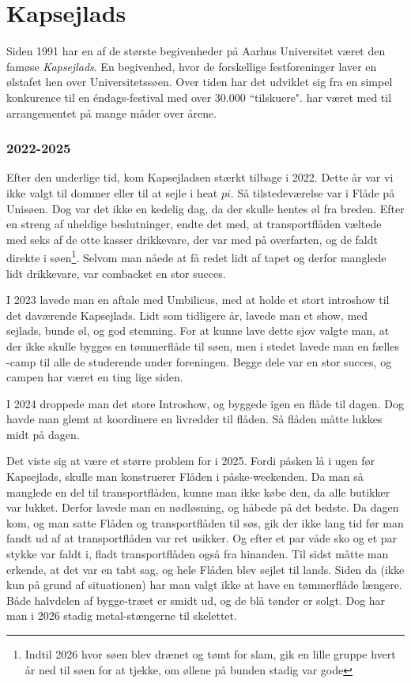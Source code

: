 \chapter{Kapsejlads}
Siden 1991 har en af de største begivenheder på Aarhus Universitet været den famøse \textit{Kapsejlads}. En begivenhed, hvor de forskellige festforeninger laver en ølstafet hen over Universitetssøen. Over tiden har det udviklet sig fra en simpel konkurence til en éndags-festival med over 30.000 ``tilskuere". \TKET har været med til arrangementet på mange måder over årene. 

\subsection{2022-2025}
Efter den underlige tid, kom Kapsejladsen stærkt tilbage i 2022. Dette år var vi ikke valgt til dommer eller til at sejle i heat $pi$. Så \TKETs tilstedeværelse var i \TKETs Flåde på Unisøen. Dog var det ikke en kedelig dag, da der skulle hentes øl fra breden. Efter en streng af uheldige beslutninger, endte det med, at transportflåden væltede med seks af de otte kasser drikkevare, der var med på overfarten, og de faldt direkte i søen\footnote{Indtil 2026 hvor søen blev drænet og tømt for slam, gik en lille gruppe hvert år ned til søen for at tjekke, om øllene på bunden stadig var gode}. Selvom man nåede at få redet lidt af tapet og derfor manglede lidt drikkevare, var combacket en stor succes.

I 2023 lavede man en aftale med Umbilicus, med at holde et stort introshow til det daværende Kapsejlads. Lidt som tidligere år, lavede man et show, med sejlads, bunde øl, og god stemning. For at kunne lave dette sjov valgte man, at der ikke skulle bygges en tømmerflåde til søen, men i stedet lavede man en fælles \TKET-camp til alle de studerende under foreningen. Begge dele var en stor succes, og campen har været en ting lige siden.

I 2024 droppede man det store Introshow, og byggede igen en flåde til dagen. Dog havde man glemt at koordinere en livredder til flåden. Så flåden måtte lukkes midt på dagen. 

Det viste sig at være et større problem for i 2025. Fordi påsken lå i ugen før Kapsejlads, skulle man konstruerer Flåden i påske-weekenden. Da man så manglede en del til transportflåden, kunne man ikke købe den, da alle butikker var lukket. Derfor lavede man en nødløsning, og håbede på det bedste. Da dagen kom, og man satte Flåden og transportflåden til søs, gik der ikke lang tid før man fandt ud af at transportflåden var ret usikker. Og efter et par våde sko og et par stykke var faldt i, fladt transportflåden også fra hinanden. Til sidst måtte man erkende, at det var en tabt sag, og hele Flåden blev sejlet til lands. Siden da (ikke kun på grund af situationen) har man valgt ikke at have en tømmerflåde længere. Både halvdelen af bygge-træet er smidt ud, og de blå tønder er solgt. Dog har man i 2026 stadig metal-stængerne til skelettet. 

